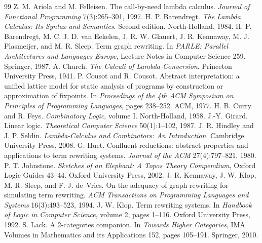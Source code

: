 \documentclass[11pt]{article}
\theoremstyle{definition}
\theoremstyle{remark}
\begin{document}
\begin{thebibliography}{99}
 Z. M. Ariola and M. Felleisen. The call-by-need lambda calculus. \emph{Journal of Functional Programming} 7(3):265--301, 1997.
 H. P. Barendregt. \emph{The Lambda Calculus: Its Syntax and Semantics}. Second edition. North-Holland, 1984.
 H. P. Barendregt, M. C. J. D. van Eekelen, J. R. W. Glauert, J. R. Kennaway, M. J. Plasmeijer, and M. R. Sleep. Term graph rewriting. In \emph{PARLE: Parallel Architectures and Languages Europe}, Lecture Notes in Computer Science 259. Springer, 1987.
 A. Church. \emph{The Calculi of Lambda-Conversion}. Princeton University Press, 1941.
 P. Cousot and R. Cousot. Abstract interpretation: a unified lattice model for static analysis of programs by construction or approximation of fixpoints. In \emph{Proceedings of the 4th ACM Symposium on Principles of Programming Languages}, pages 238--252. ACM, 1977.
 H. B. Curry and R. Feys. \emph{Combinatory Logic}, volume I. North-Holland, 1958.
 J.-Y. Girard. Linear logic. \emph{Theoretical Computer Science} 50(1):1--102, 1987.
 J. R. Hindley and J. P. Seldin. \emph{Lambda-Calculus and Combinators: An Introduction}. Cambridge University Press, 2008.
 G. Huet. Confluent reductions: abstract properties and applications to term rewriting systems. \emph{Journal of the ACM} 27(4):797--821, 1980.
 P. T. Johnstone. \emph{Sketches of an Elephant: A Topos Theory Compendium}, Oxford Logic Guides 43--44. Oxford University Press, 2002.
 J. R. Kennaway, J. W. Klop, M. R. Sleep, and F. J. de~Vries. On the adequacy of graph rewriting for simulating term rewriting. \emph{ACM Transactions on Programming Languages and Systems} 16(3):493--523, 1994.
 J. W. Klop. Term rewriting systems. In \emph{Handbook of Logic in Computer Science}, volume 2, pages 1--116. Oxford University Press, 1992.
 S. Lack. A 2-categories companion. In \emph{Towards Higher Categories}, IMA Volumes in Mathematics and its Applications 152, pages 105--191. Springer, 2010.

\end{thebibliography}
\end{document}
